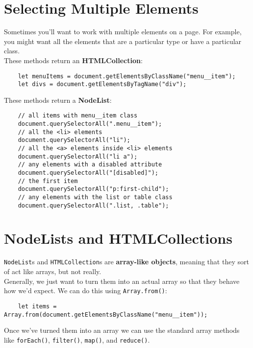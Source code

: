 \section{Selecting Multiple Elements}

Sometimes you'll want to work with multiple elements on a page. For example, you might want all the elements that are a particular type or have a particular class.
\\

These methods return an \textbf{HTMLCollection}:

\begin{verbatim}
    let menuItems = document.getElementsByClassName("menu__item");
    let divs = document.getElementsByTagName("div");
\end{verbatim}

These methods return a \textbf{NodeList}:

\begin{verbatim}
    // all items with menu__item class
    document.querySelectorAll(".menu__item");
    // all the <li> elements
    document.querySelectorAll("li");
    // all the <a> elements inside <li> elements
    document.querySelectorAll("li a");
    // any elements with a disabled attribute
    document.querySelectorAll("[disabled]");
    // the first item
    document.querySelectorAll("p:first-child");
    // any elements with the list or table class
    document.querySelectorAll(".list, .table");
\end{verbatim}


\section{NodeLists and HTMLCollections}

\texttt{NodeList}s and \texttt{HTMLCollection}s are \textbf{array-like objects}, meaning that they sort of act like arrays, but not really.
\\

Generally, we just want to turn them into an actual array so that they behave how we'd expect. We can do this using \texttt{Array.from()}:

\begin{verbatim}
    let items = Array.from(document.getElementsByClassName("menu__item"));
\end{verbatim}

Once we've turned them into an array we can use the standard array methods like \texttt{forEach()}, \texttt{filter()}, \texttt{map()}, and \texttt{reduce()}.
\\

